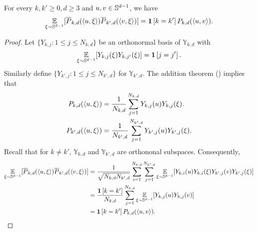 \begin{lemma}\label{lem:legendre-poly-inner-product}
	For every $k,k'\ge 0,d\ge 3$ and $u,v\in\mathbb{S}^{d-1}$, we have
	\begin{align}
		\operatorname*{\mathbb{E}}_{\xi\sim \mathbb{S}^{d-1}}[\overline{P}_{k,d}(\left<u, \xi\right>)\overline{P}_{k',d}(\left<v, \xi\right>)]=\mathbf{1}\left[ k=k' \right]P_{k,d}(\left<u, v\right>).
	\end{align}
\end{lemma}
\begin{proof}
	Let $\{Y_{k,j}:1\le j\le N_{k,d}\}$ be an orthonormal basis of $\mathbb{Y}_{k,d}$ with 
	\begin{align}
		\operatorname*{\mathbb{E}}_{\xi\sim \mathbb{S}^{d-1}}[Y_{k,j}(\xi)Y_{k,j'}(\xi)]=\mathbf{1}\left[ j=j' \right].
	\end{align} Similarly define $\{Y_{k',j}:1\le j\le N_{k',d}\}$ for $\mathbb{Y}_{k',d}.$
	The addition theorem () implies that
	\begin{align}
		P_{k,d}(\left<u, \xi\right>)&=\frac{1}{N_{k,d}}\sum_{j=1}^{N_{k,d}}Y_{k,j}(u)Y_{k,j}(\xi).\\
		P_{k',d}(\left<u, \xi\right>)&=\frac{1}{N_{k',d}}\sum_{j=1}^{N_{k',d}}Y_{k',j}(u)Y_{k',j}(\xi).
	\end{align}
        Recall that for $k\neq k'$, $\mathbb{Y}_{k,d}$ and $\mathbb{Y}_{k',d}$ are orthononal subspaces. Consequently,
	\begin{align}
		\E_{\xi\sim \Sp}[\overline{P}_{k,d}(\dotp{u}{\xi})\overline{P}_{k',d}(\dotp{v}{\xi})]%
		=&\;\frac{1}{\sqrt{N_{k,d}N_{k',d}}}\sum_{i=1}^{N_{k,d}}\sum_{j=1}^{N_{k',d}}\E_{\xi\sim \Sp}[Y_{k,i}(u)Y_{k,i}(\xi)Y_{k',j}(v)Y_{k',j}(\xi)]\\
		=&\;\frac{\ind{k=k'}}{N_{k,d}}\sum_{j=1}^{N_{k,d}}\E_{\xi\sim \Sp}[Y_{k,j}(u)Y_{k,j}(v)]\\
		=&\;\ind{k=k'}P_{k,d}(\dotp{u}{v}).
	\end{align}
\end{proof}

